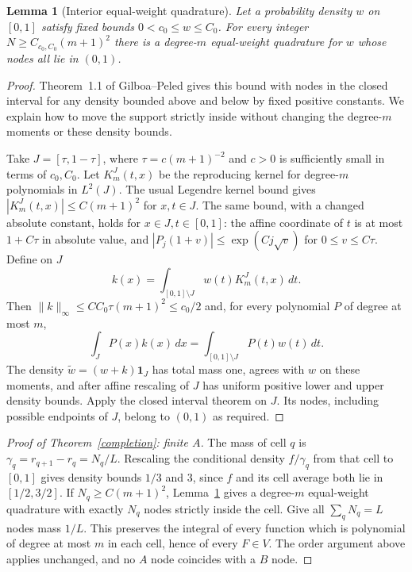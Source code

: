 \documentclass[11pt]{article}
\newtheorem{lemma}{Lemma}
\begin{document}
\begin{lemma}[Interior equal-weight quadrature]\label{interior}
Let a probability density $w$ on $[0,1]$ satisfy fixed bounds
$0<c_0\le w\le C_0$. For every integer $N\ge C_{c_0,C_0}(m+1)^2$
there is a degree-$m$ equal-weight quadrature for $w$ whose nodes all
lie in $(0,1)$.
\end{lemma}
\begin{proof}
Theorem~1.1 of Gilboa--Peled gives this bound with nodes in the closed
interval for any density bounded above and below by fixed positive
constants. We explain how to move the support strictly inside without
changing the degree-$m$ moments or these density bounds.

Take $J=[\tau,1-\tau]$, where $\tau=c(m+1)^{-2}$ and $c>0$ is sufficiently
small in terms of $c_0,C_0$. Let $K_m^J(t,x)$ be the reproducing kernel
for degree-$m$ polynomials in $L^2(J)$. The usual Legendre kernel bound
gives $|K_m^J(t,x)|\le C(m+1)^2$ for $x,t\in J$. The same bound, with
a changed absolute constant, holds for $x\in J,t\in[0,1]$: the affine
coordinate of $t$ is at most $1+C\tau$ in absolute value, and
$|P_j(1+v)|\le\exp(Cj\sqrt v)$ for $0\le v\le C\tau$.
Define on $J$
\[
 k(x)=\int_{[0,1]\setminus J}w(t)K_m^J(t,x)\,dt.
\]
Then $\|k\|_\infty\le C C_0\tau(m+1)^2\le c_0/2$ and, for every
polynomial $P$ of degree at most $m$,
\[
 \int_J P(x)k(x)\,dx
 =\int_{[0,1]\setminus J}P(t)w(t)\,dt.
\]
The density $\widetilde w=(w+k)\mathbf1_J$ has total mass one, agrees
with $w$ on these moments, and after affine rescaling of $J$ has
uniform positive lower and upper density bounds. Apply the closed
interval theorem on $J$. Its nodes, including possible endpoints of
$J$, belong to $(0,1)$ as required.
\end{proof}

\begin{proof}[Proof of Theorem~\ref{completion}: finite $A$]
The mass of cell $q$ is $\gamma_q=r_{q+1}-r_q=N_q/L$.
Rescaling the conditional density $f/\gamma_q$ from that cell to $[0,1]$
gives density bounds $1/3$ and $3$, since $f$ and its cell average both
lie in $[1/2,3/2]$. If $N_q\ge C(m+1)^2$, Lemma~\ref{interior} gives
a degree-$m$ equal-weight quadrature with exactly $N_q$ nodes strictly
inside the cell. Give all $\sum_qN_q=L$ nodes mass $1/L$. This preserves
the integral of every function which is polynomial of degree at most
$m$ in each cell, hence of every $F\in V$. The order argument above
applies unchanged, and no $A$ node coincides with a $B$ node.
\end{proof}
\end{document}
